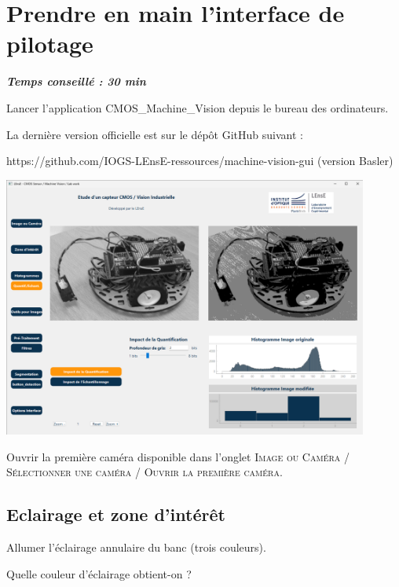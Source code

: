 \documentclass[a4paper,11pt,titlepage]{article} %
\begin{document}

\section{Prendre en main l'interface de pilotage}

\begin{center} \textbf{\textit{Temps conseillé : 30 min}} \end{center}

\Manip Lancer l'application CMOS\_Machine\_Vision depuis le bureau des ordinateurs.

La dernière version officielle est sur le dépôt GitHub suivant : 

https://github.com/IOGS-LEnsE-ressources/machine-vision-gui  (version Basler)


\begin{center}
	\includegraphics[width=0.9\textwidth]{./images/camera_gui.png}
\end{center}


\Manip Ouvrir la première caméra disponible dans l'onglet \textsc{Image ou Caméra} / \textsc{Sélectionner une caméra} / \textsc{Ouvrir la première caméra}.

\subsection{Eclairage et zone d'intérêt}

\Manip Allumer l'éclairage annulaire du banc (trois couleurs). 

\Quest Quelle couleur d'éclairage obtient-on ?
\end{document}
